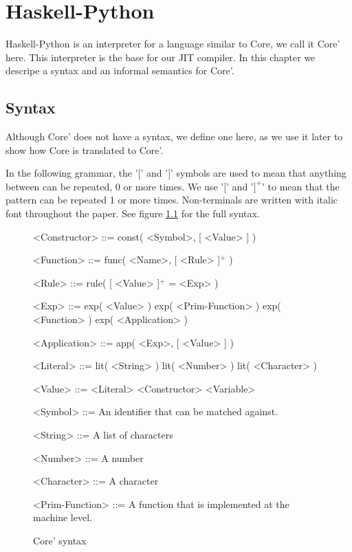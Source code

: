 
\chapter{Haskell-Python}
\label{chap:hs}


Haskell-Python is an interpreter for a language similar to Core, we call it Core' here.
This interpreter is the base for our JIT compiler. In this chapter we descripe a 
syntax and an informal semantics for Core'.

\section{Syntax}
\label{sec:syntax}

Although Core' does not have a syntax, we define one here, as we use it later 
to show how Core is translated to Core'.

In the following grammar, the '[' and ']' symbols are used to mean that
anything between can be repeated, 0 or more times. We use '[' and '$]^+$' to 
mean that the pattern can be repeated 1 or more times. Non-terminals are 
written with italic font throughout the paper.
See figure \ref{gr:coresyn} for the full syntax.

\begin{figure}%
\centering

\begin{grammar}
<Constructor> ::= const( <Symbol>, [ <Value> ] )

<Function> ::= func( <Name>, [ <Rule> ]$^+$ )

<Rule> ::= rule( [ <Value> ]$^+$ = <Exp> )

<Exp> ::= exp( <Value> )
     \alt exp( <Prim-Function> )
     \alt exp( <Function> )
     \alt exp( <Application> )

<Application> ::= app( <Exp>, [ <Value> ] )

<Literal> ::= lit( <String> )
	 \alt lit( <Number> )
	 \alt lit( <Character> )

<Value> ::= <Literal>
       \alt <Constructor>
       \alt <Variable>

<Symbol> ::= An identifier that can be matched against.

<String> ::= A list of characters

<Number> ::= A number

<Character> ::= A character

<Prim-Function> ::= A function that is implemented at the machine level.

\end{grammar}

\label{gr:coresyn}
\caption{Core' syntax}
\end{figure}

